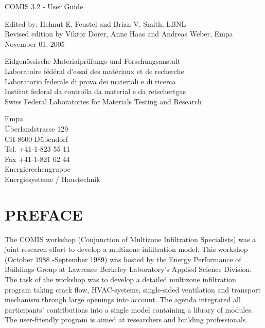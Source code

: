 \documentclass[10pt]{book}
\begin{document}
\frontmatter
\begin{titlepage}

COMIS 3.2 - User Guide 

Edited by: Helmut E. Feustel and Brian V. Smith, LBNL\\
Revised edition by Viktor Dorer, Anne Haas and Andreas Weber, Empa November 01, 2005

Eidgen\"ossische Materialpr\"ufungs-und Forschungsanstalt\\
Laboratoire f\'ed\'eral d'essai des mat\'eriaux et de recherche\\
Laboratorio federale di prova dei materiali e di ricerca\\
Institut federal da controlla da material e da retschertgas\\
Swiss Federal Laboratories for Materials Testing and Research

Empa\\
\"Uberlandstrasse 129\\
CH-8600 D\"ubendorf\\
Tel. +41-1-823 55 11\\
Fax +41-1-821 62 44\\

Energierechengruppe\\
Energiesysteme / Haustechnik

\end{titlepage}
\chapter{PREFACE}
The COMIS workshop (Conjunction of Multizone Infiltration Specialists) was a joint research effort to develop a multizone infiltration model. This workshop (October 1988 -September 1989) was hosted by the Energy Performance of Buildings Group at Lawrence Berkeley Laboratory's Applied Science Division. The task of the workshop was to develop a detailed multizone infiltration program taking crack flow, HVAC-systems, single-sided ventilation and transport mechanism through large openings into account. The agenda integrated all participants' contributions into a single model containing a library of modules. The user-friendly program is aimed at researchers and building professionals. 
\end{document}
